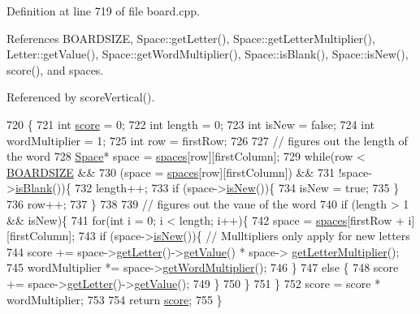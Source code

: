 Definition at line 719 of file board.\-cpp.



References B\-O\-A\-R\-D\-S\-I\-Z\-E, Space\-::get\-Letter(), Space\-::get\-Letter\-Multiplier(), Letter\-::get\-Value(), Space\-::get\-Word\-Multiplier(), Space\-::is\-Blank(), Space\-::is\-New(), score(), and spaces.



Referenced by score\-Vertical().


\begin{DoxyCode}
720 \{
721     \textcolor{keywordtype}{int} \hyperlink{class_board_a48c3a272cb4a47509ddd88edaec2bb59}{score} = 0;
722     \textcolor{keywordtype}{int} length = 0;
723     \textcolor{keywordtype}{int} isNew = \textcolor{keyword}{false};
724     \textcolor{keywordtype}{int} wordMultiplier = 1;
725     \textcolor{keywordtype}{int} row = firstRow;
726 
727     \textcolor{comment}{// figures out the length of the word}
728     \hyperlink{class_space}{Space}* space = \hyperlink{class_board_a73b12248ddb6ee3adc24f4458d8661c2}{spaces}[row][firstColumn];
729     \textcolor{keywordflow}{while}(row < \hyperlink{board_8h_afb909c1a2193edc88c68390c025b2fa7}{BOARDSIZE} &&
730           (space = \hyperlink{class_board_a73b12248ddb6ee3adc24f4458d8661c2}{spaces}[row][firstColumn]) &&
731           !space->\hyperlink{class_space_a308f0ef400183df78df69717ca50cfee}{isBlank}())\{
732         length++;
733         \textcolor{keywordflow}{if} (space->\hyperlink{class_space_aa24aa1c8ac8b6033fc041d79345bac71}{isNew}())\{
734             isNew = \textcolor{keyword}{true};
735         \}
736         row++;
737     \}
738 
739     \textcolor{comment}{// figures out the vaue of the word}
740     \textcolor{keywordflow}{if} (length > 1 && isNew)\{
741         \textcolor{keywordflow}{for}(\textcolor{keywordtype}{int} i = 0; i < length; i++)\{
742             space = \hyperlink{class_board_a73b12248ddb6ee3adc24f4458d8661c2}{spaces}[firstRow + i][firstColumn];
743             \textcolor{keywordflow}{if} (space->\hyperlink{class_space_aa24aa1c8ac8b6033fc041d79345bac71}{isNew}())\{  \textcolor{comment}{// Mulltipliers only apply for new letters}
744                 score += space->\hyperlink{class_space_a207bc025538775ce43bdcc0d8c4c3599}{getLetter}()->\hyperlink{class_letter_a5980d43229d58bfab9fdb20f25e88e9e}{getValue}() * space->
      \hyperlink{class_space_af35759deb33db2b7b7c77a40716c179f}{getLetterMultiplier}();
745                 wordMultiplier *= space->\hyperlink{class_space_a6a26a281a90288d56c83cc76b53cb6fb}{getWordMultiplier}();
746             \}
747             \textcolor{keywordflow}{else} \{
748                 score += space->\hyperlink{class_space_a207bc025538775ce43bdcc0d8c4c3599}{getLetter}()->\hyperlink{class_letter_a5980d43229d58bfab9fdb20f25e88e9e}{getValue}();
749             \}
750         \}
751     \}
752     score = score * wordMultiplier;
753 
754     \textcolor{keywordflow}{return} \hyperlink{class_board_a48c3a272cb4a47509ddd88edaec2bb59}{score};
755 \}
\end{DoxyCode}
